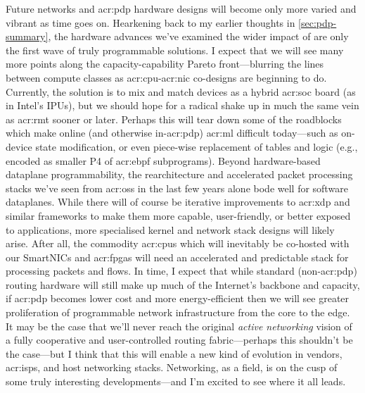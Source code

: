 
Future networks and \gls{acr:pdp} hardware designs will become only more varied and vibrant as time goes on.
Hearkening back to my earlier thoughts in \cref{sec:pdp-summary}, the hardware advances we've examined the wider impact of are only the first wave of truly programmable solutions.
I expect that we will see many more points along the capacity-capability Pareto front---blurring the lines between compute classes as \gls{acr:cpu}-\gls{acr:nic} co-designs are beginning to do.
Currently, the solution is to mix and match devices as a hybrid \gls{acr:soc} board (as in Intel's IPUs), but we should hope for a radical shake up in much the same vein as \gls{acr:rmt} sooner or later.
Perhaps this will tear down some of the roadblocks which make online (and otherwise in-\gls{acr:pdp}) \gls{acr:ml} difficult today---such as on-device state modification, or even piece-wise replacement of tables and logic (e.g., encoded as smaller P4 of \gls{acr:ebpf} subprograms).
Beyond hardware-based dataplane programmability, the rearchitecture and accelerated packet processing stacks we've seen from \glspl{acr:os} in the last few years alone bode well for software dataplanes.
While there will of course be iterative improvements to \gls{acr:xdp} and similar frameworks to make them more capable, user-friendly, or better exposed to applications, more specialised kernel and network stack designs will likely arise.
After all, the commodity \glspl{acr:cpu} which will inevitably be co-hosted with our SmartNICs and \glspl{acr:fpga} will need an accelerated and predictable stack for processing packets and flows.
In time, I expect that while standard (non-\gls{acr:pdp}) routing hardware will still make up much of the Internet's backbone and capacity, if \gls{acr:pdp} becomes lower cost and more energy-efficient then we will see greater proliferation of programmable network infrastructure from the core to the edge.
It may be the case that we'll never reach the original \emph{active networking} vision of a fully cooperative and user-controlled routing fabric---perhaps this shouldn't be the case---but I think that this will enable a new kind of evolution in vendors, \glspl{acr:isp}, and host networking stacks.
Networking, as a field, is on the cusp of some truly interesting developments---and I'm excited to see where it all leads.

